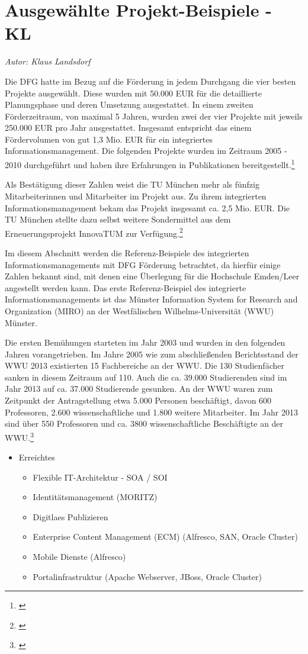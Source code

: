 \section{Ausgewählte Projekt-Beispiele - KL}
\textit{Autor: Klaus Landsdorf}

\label{section_projekt_beispiele}
Die DFG hatte im Bezug auf die Förderung in jedem Durchgang die vier besten Projekte ausgewählt.
Diese wurden mit 50.000 EUR für die detaillierte Planungsphase und deren Umsetzung ausgestattet.
In einem zweiten Förderzeitraum, von maximal 5 Jahren, wurden zwei der vier Projekte mit jeweils 250.000 EUR pro Jahr ausgestattet.
Insgesamt entspricht das einem Fördervolumen von gut 1,3 Mio. EUR für ein integriertes Informationsmanagement.
Die folgenden Projekte wurden im Zeitraum 2005 - 2010 durchgeführt und haben ihre Erfahrungen in Publikationen bereitgestellt.\footnote{\cite{kerres_hochschulen_2005}}

Als Bestätigung dieser Zahlen weist die TU München mehr als fünfzig Mitarbeiterinnen und Mitarbeiter im Projekt aus. Zu ihrem integrierten Informationsmanagement bekam das Projekt insgesamt ca. 2,5 Mio. EUR. Die TU München stellte dazu selbst weitere Sondermittel aus dem Erneuerungsprojekt InnovaTUM zur Verfügung.\footnote{\cite{bode_informationsmanagement_2010}}

Im diesem Abschnitt werden die Referenz-Beispiele des integrierten Informationsmanagements mit DFG Förderung betrachtet, da hierfür einige Zahlen bekannt sind, mit denen eine
Überlegung für die Hochschule Emden/Leer angestellt werden kann. Das erste Referenz-Beispiel des integrierte Informationsmanagements ist das Münster Information System for Research and Organization (MIRO) an der Westfälischen Wilhelms-Universität (WWU) Münster.

Die ersten Bemühungen starteten im Jahr 2003 und wurden in den folgenden Jahren vorangetrieben. Im Jahre 2005 wie zum abschließenden Berichtsstand der WWU 2013 existierten 15 Fachbereiche an der WWU. Die 130 Studienfächer sanken in diesem Zeitraum auf 110. Auch die ca. 39.000 Studierenden sind im Jahr 2013 auf ca. 37.000 Studierende gesunken. An der WWU waren zum Zeitpunkt der Antragstellung etwa 5.000 Personen beschäftigt, davon 600 Professoren, 2.600 wissenschaftliche und 1.800 weitere Mitarbeiter. Im Jahr 2013 sind über 550 Professoren und ca. 3800 wissenschaftliche Beschäftigte an der WWU.\footnote{\cite{vogl_bericht_2013}}

\begin{itemize}
	\item Erreichtes
	\begin{itemize}
		\item Flexible IT-Architektur - SOA / SOI
		\item Identitätsmanagement (MORITZ)
		\item Digitlaes Publizieren
		\item Enterprise Content Management (ECM) (Alfresco, SAN, Oracle Cluster)
		\item Mobile Dienste (Alfresco)
		\item Portalinfrastruktur (Apache Webserver, JBoss, Oracle Cluster)
	\end{itemize}
\end{itemize}

